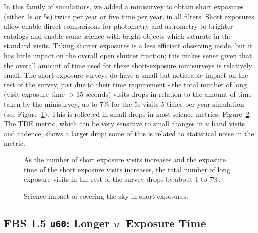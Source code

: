 In this family of simulations, we added a minisurvey to obtain short exposures (either 1s or 5s) twice per year or five time per year, in all filters. Short exposures allow enable direct comparisons for photometry and astrometry to brighter catalogs and enable some science with bright objects which saturate in the standard visits. Taking shorter exposures is a less efficient observing mode, but it has little impact on the overall open shutter fraction; this makes sense given that the overall amount of time used for these short-exposure minisurveys is relatively small. The short exposure surveys do have a small but noticeable impact on the rest of the survey, just due to their time requirement - the total number of long (visit exposure time $>15$ seconds) visits drops in relation to the amount of time taken by the minisurvey, up to 7\% for the 5s visits 5 times per year simulation (see Figure~\ref{fig:shortexp_nvisits}). This is reflected in small drops in most science metrics, Figure~\ref{fig:shortexp_radar}. The TDE metric, which can be very sensitive to small changes in $u$ band visits and cadence, shows a larger drop; some of this is related to statistical noise in the metric. 

\begin{figure}
\caption{As the number of short exposure visits increases and the exposure time of the short exposure visits increases, the total number of long exposure visits in the rest of the survey drops by about 1 to 7\%. }\label{fig:shortexp_nvisits}
\end{figure}

\begin{figure}
\caption{Science impact of covering the sky in short exposures. }\label{fig:shortexp_radar}
\end{figure}


\subsection{FBS 1.5 {\tt u60}: Longer $u$\ Exposure Time}\label{ss:u60}

